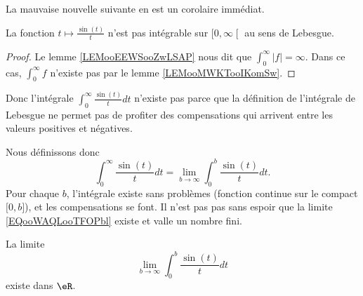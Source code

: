 La mauvaise nouvelle suivante en est un corolaire immédiat.
\begin{lemma}       \label{LEMooBEQRooHaugKj}
    La fonction \( t\mapsto \frac{ \sin(t) }{ t }\) n'est pas intégrable sur \( \mathopen[ 0 , \infty \mathclose[\) au sens de Lebesgue.
\end{lemma}

\begin{proof}
    Le lemme \ref{LEMooEEWSooZwLSAP} nous dit que \( \int_0^{\infty}| f |=\infty\). Dans ce cas, \( \int_0^{\infty}f\) n'existe pas par le lemme \ref{LEMooMWKTooIKomSw}.
\end{proof}

Donc l'intégrale \( \int_0^{\infty}\frac{ \sin(t) }{ t }dt\) n'existe pas parce que la définition de l'intégrale de Lebesgue ne permet pas de profiter des compensations qui arrivent entre les valeurs positives et négatives.

Nous définissons donc
\begin{equation}        \label{EQooWAQLooTFOPbl}
    \int_0^{\infty}\frac{ \sin(t) }{ t }dt=\lim_{b\to \infty} \int_0^b\frac{ \sin(t) }{ t }dt.
\end{equation}
Pour chaque \( b\), l'intégrale existe sans problèmes (fonction continue sur le compact \( \mathopen[ 0 , b \mathclose]\)), et les compensations se font. Il n'est pas pas sans espoir que la limite \eqref{EQooWAQLooTFOPbl} existe et valle un nombre fini.

\begin{lemma}     \label{LEMooTFVZooRAmjUN}
    La limite
    \begin{equation}
        \lim_{b\to \infty}\int_0^b\frac{ \sin(t) }{ t }dt
    \end{equation}
    existe dans \( \eR\).
\end{lemma}

